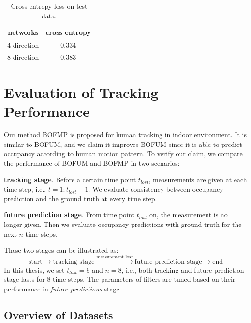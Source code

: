  \begin{table}[H]
\centering
  \begin{tabular}{c|c}
    \hline
     networks      &      cross entropy  \\ \hline
     4-direction   &      0.334 \\ \hline
     8-direction   &      0.383 \\          
   \hline
 \end{tabular}
\caption{Cross entropy loss on test data.}
\label{table:loss_on_test}
\end{table}

\section{Evaluation of Tracking Performance}

Our method BOFMP is proposed for human tracking in indoor environment. It is similar to BOFUM, and we claim it improves BOFUM since it is able to predict occupancy according to human motion pattern. To verify our claim, we compare the performance of BOFUM and BOFMP in two scenarios:

\begin{my_enumerate}
\item \textbf{tracking stage}. Before a certain time point \( t_{lost} \), measurements are given at each time step, i.e., $t=1:t_{lost}-1$. We evaluate consistency between occupancy prediction and the ground truth at every time step.
\item \textbf{future prediction stage}. From time point \( t_{lost} \) on, the measurement is no longer given. Then we evaluate occupancy predictions with ground truth for the next \( n \) time steps.
\end{my_enumerate}

These two stages can be illustrated as:
\[\text{start} \rightarrow \text{tracking stage} \xrightarrow{\text{measurement lost}} \text{future prediction stage} \rightarrow \text{end}\]
In this thesis, we set $t_{lost}=9$ and $n=8$, i.e., both tracking and future prediction stage lasts for 8 time steps. The parameters of filters are tuned based on their performance in \textit{future predictions} stage. 


\subsection{Overview of Datasets}


